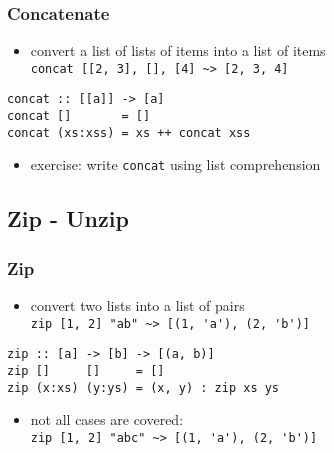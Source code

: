 \documentclass[dvipsnames]{beamer}
\theoremstyle{plain}
\begin{document}
\begin{frame}[fragile]
  \frametitle{Concatenate}

  \begin{itemize}
    \item convert a list of lists of items into a list of items\\
      \lstinline|concat [[2, 3], [], [4] ~> [2, 3, 4]|
  \end{itemize}

  \begin{exampleblock}{}
    \begin{lstlisting}[deletekeywords={concat}]
concat :: [[a]] -> [a]
concat []       = []
concat (xs:xss) = xs ++ concat xss
    \end{lstlisting}
  \end{exampleblock}

  \pause
  \begin{itemize}
    \item exercise: write \lstinline|concat| using list comprehension
  \end{itemize}
\end{frame}

\subsection{Zip - Unzip}

\begin{frame}[fragile]
  \frametitle{Zip}

  \begin{itemize}
    \item convert two lists into a list of pairs\\
      \lstinline[style=exclamfix]|zip [1, 2] "ab" ~> [(1, 'a'), (2, 'b')]|
  \end{itemize}

  \begin{exampleblock}{}
    \begin{lstlisting}[deletekeywords={zip}]
zip :: [a] -> [b] -> [(a, b)]
zip []     []     = []
zip (x:xs) (y:ys) = (x, y) : zip xs ys
    \end{lstlisting}
  \end{exampleblock}

  \pause
  \begin{itemize}
    \item not all cases are covered:\\
      \lstinline[style=exclamfix]|zip [1, 2] "abc" ~> [(1, 'a'), (2, 'b')]|
  \end{itemize}
\end{frame}
\end{document}
